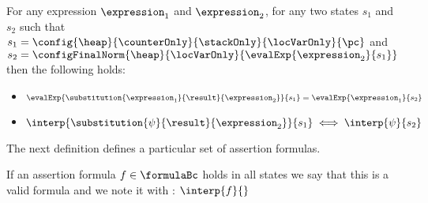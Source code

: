 \begin{substRet}\label{substRet} 
For any expression $\expression_1$ and $\expression_2$,
for any two states $s_1$ and $s_2$  such that
$ s_1 =   \config{\heap}{\counterOnly}{ \stackOnly }{\locVarOnly}{\pc }$ and \\
$ s_2 =   \configFinalNorm{\heap}{\locVarOnly}{\evalExp{\expression_2}{s_1} } $ then 
the following holds:
\begin{itemize}
      \item $\evalExp{\substitution{\expression_1}{ \result }{ \expression_2 }}{ s_1 } = \evalExp{\expression_1}{s_2} $
      \item $\interp{\substitution{\psi}{ \result}{ \expression_2 }}{ s_1 } \iff \interp{\psi}{s_2} $
\end{itemize}
\end{substRet}


The next definition defines a particular set of assertion formulas.
\begin{valid}
  If an assertion formula  $ f \in \formulaBc $ holds in all states we say that this is a valid formula and we note it with :
  $ \interp{f}{}$
\end{valid}
